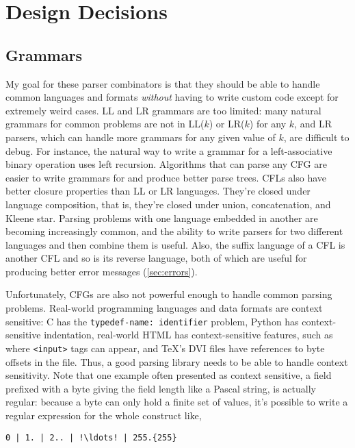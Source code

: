 \documentclass[12pt]{article}
\begin{document}
\section{Design Decisions}
\label{sec:design_decisions}


\subsection{Grammars}
\label{sec:grammar}

My goal for these parser combinators is that they should be able to
handle common languages and formats \emph{without} having to write
custom code except for extremely weird cases.  LL and LR grammars are
too limited: many natural grammars for common problems are not in
LL($k$) or LR($k$) for any $k$, and LR parsers, which can handle more
grammars for any given value of $k$, are difficult to debug.  For
instance, the natural way to write a grammar for a left-associative
binary operation uses left recursion.  Algorithms that can parse any
CFG are easier to write grammars for and produce better parse trees.
CFLs also have better closure properties than LL or LR languages.
They're closed under language composition, that is, they're closed
under union, concatenation, and Kleene star.  Parsing problems with
one language embedded in another are becoming increasingly common, and
the ability to write parsers for two different languages and then
combine them is useful.  Also, the suffix language of a CFL is another
CFL \parencite[p. 401]{grune_jacobs} and so is its reverse language,
both of which are useful for producing better error messages
(\ref{sec:errors}).

Unfortunately, CFGs are also not powerful enough to handle common
parsing problems.  Real-world programming languages and data formats
are context sensitive: C has the \texttt{typedef-name: identifier}
problem, Python has context-sensitive indentation, real-world HTML has
context-sensitive features, such as where \texttt{<input>} tags can
appear, and \TeX's DVI files have references to byte offsets in the
file.  Thus, a good parsing library needs to be able to handle context
sensitivity.  Note that one example often presented as context
sensitive, a field prefixed with a byte giving the field length like a
Pascal string, is actually regular: because a byte can only hold a
finite set of values, it's possible to write a regular expression for
the whole construct like,

\begin{lstlisting}
0 | 1. | 2.. | !\ldots! | 255.{255}
\end{lstlisting}
\end{document}
